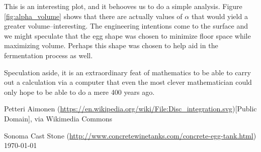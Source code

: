 \documentclass[10pt, reqno]{article}
\numberwithin{equation}{section}
\numberwithin{figure}{section}
\begin{document}
This is an interesting plot, and it behooves us to do a simple analysis. Figure \ref{fig:alpha_volume} shows that there are actually values of $\alpha$ that would yield a greater volume--interesting. The engineering intentions come to the surface and we might speculate that the egg shape was chosen to minimize floor space while maximizing volume. Perhaps this shape was chosen to help aid in the fermentation process as well. 

Speculation aside, it is an extraordinary feat of mathematics to be able to carry out a calculation via a computer that even the most clever mathematician could only hope to be able to do a mere 400 years ago. 



\begin{thebibliography}{XX}

Petteri Aimonen (\url{https://en.wikipedia.org/wiki/File:Disc_integration.svg})[Public Domain], via Wikimedia Commons

Sonoma Cast Stone (\url{http://www.concretewinetanks.com/concrete-egg-tank.html}) \today

\end{thebibliography} 
\end{document}
